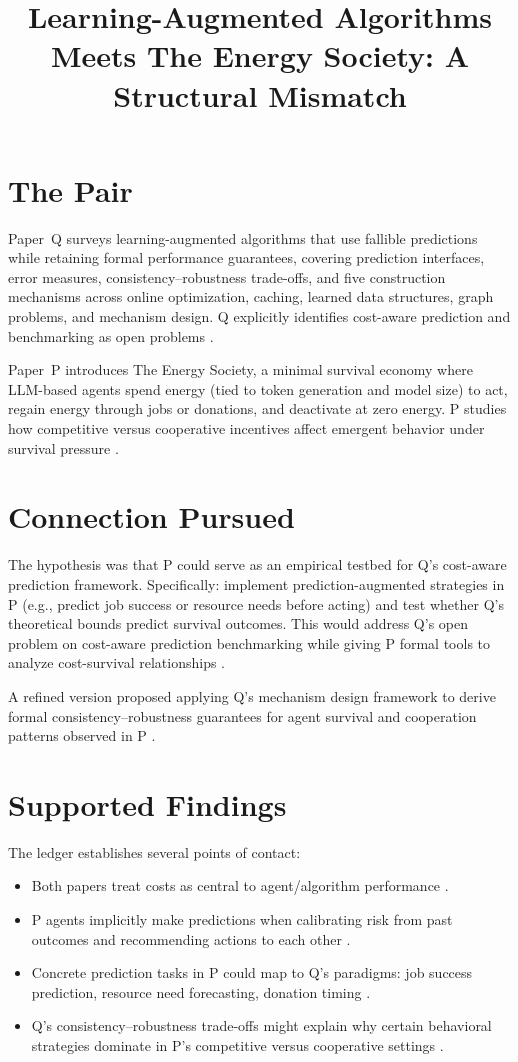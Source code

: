 \documentclass{article}
\title{Learning-Augmented Algorithms Meets The Energy Society: A Structural Mismatch}
\begin{document}
\section*{The Pair}

Paper~Q surveys learning-augmented algorithms that use fallible predictions while retaining formal performance guarantees, covering prediction interfaces, error measures, consistency--robustness trade-offs, and five construction mechanisms across online optimization, caching, learned data structures, graph problems, and mechanism design. Q explicitly identifies cost-aware prediction and benchmarking as open problems .

Paper~P introduces The Energy Society, a minimal survival economy where LLM-based agents spend energy (tied to token generation and model size) to act, regain energy through jobs or donations, and deactivate at zero energy. P studies how competitive versus cooperative incentives affect emergent behavior under survival pressure .

\section*{Connection Pursued}

The hypothesis was that P could serve as an empirical testbed for Q's cost-aware prediction framework. Specifically: implement prediction-augmented strategies in P (e.g., predict job success or resource needs before acting) and test whether Q's theoretical bounds predict survival outcomes. This would address Q's open problem on cost-aware prediction benchmarking while giving P formal tools to analyze cost-survival relationships .

A refined version proposed applying Q's mechanism design framework to derive formal consistency--robustness guarantees for agent survival and cooperation patterns observed in P .

\section*{Supported Findings}

The ledger establishes several points of contact:
\begin{itemize}
    \item Both papers treat costs as central to agent/algorithm performance .
    \item P agents implicitly make predictions when calibrating risk from past outcomes and recommending actions to each other .
    \item Concrete prediction tasks in P could map to Q's paradigms: job success prediction, resource need forecasting, donation timing .
    \item Q's consistency--robustness trade-offs might explain why certain behavioral strategies dominate in P's competitive versus cooperative settings .
\end{itemize}
\end{document}
